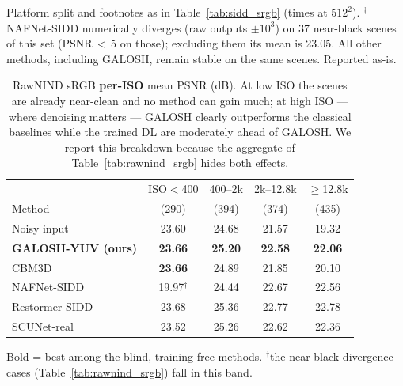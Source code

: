 \begin{table}[t]
\vspace{2pt}
{\footnotesize Platform split and footnotes as in Table~\ref{tab:sidd_srgb}
(times at $512^2$). $^{\dagger}$NAFNet-SIDD numerically diverges (raw outputs
$\pm10^3$) on 37 near-black scenes of this set (PSNR\,$<$\,5 on those);
excluding them its mean is 23.05. All other methods, including GALOSH, remain
stable on the same scenes. Reported as-is.}
\end{table}

\begin{table}[t]
\centering
\caption{RawNIND sRGB \textbf{per-ISO} mean PSNR (dB). At low ISO the scenes
are already near-clean and no method can gain much; at high ISO --- where
denoising matters --- GALOSH clearly outperforms the classical baselines while
the trained DL are moderately ahead of GALOSH. We report this breakdown because
the aggregate of Table~\ref{tab:rawnind_srgb} hides both effects.}
\label{tab:rawnind_srgb_iso}
\setlength{\tabcolsep}{5pt}
\begin{tabular}{l cccc}
\toprule
 & ISO$<$400 & 400--2k & 2k--12.8k & $\geq$12.8k\\
Method & (290) & (394) & (374) & (435)\\
\midrule
Noisy input      & 23.60 & 24.68 & 21.57 & 19.32\\
\addlinespace[2pt]
\textbf{GALOSH-YUV (ours)} & \textbf{23.66} & \textbf{25.20} & \textbf{22.58} & \textbf{22.06}\\
CBM3D            & \textbf{23.66} & 24.89 & 21.85 & 20.10\\
\midrule
NAFNet-SIDD      & 19.97$^{\dagger}$ & 24.44 & 22.67 & 22.56\\
Restormer-SIDD   & 23.68 & 25.36 & 22.77 & 22.78\\
SCUNet-real      & 23.52 & 25.26 & 22.62 & 22.36\\
\bottomrule
\end{tabular}

\vspace{2pt}
{\footnotesize Bold = best among the blind, training-free methods.
$^{\dagger}$the near-black divergence cases (Table~\ref{tab:rawnind_srgb})
fall in this band.}
\end{table}
